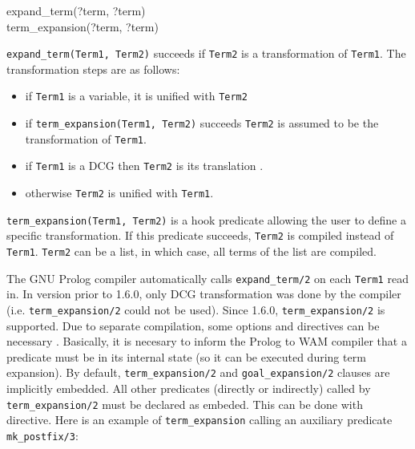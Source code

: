 \begin{TemplatesOneCol}
expand\_term(?term, ?term)\\
term\_expansion(?term, ?term)

\end{TemplatesOneCol}

\Description

\texttt{expand\_term(Term1, Term2)} succeeds if
\texttt{Term2} is a transformation of \texttt{Term1}. The transformation
steps are as follows:

\begin{itemize}

\item if \texttt{Term1} is a variable, it is unified with \texttt{Term2}

\item if \texttt{term\_expansion(Term1, Term2)} succeeds \texttt{Term2} is
  assumed to be the transformation of \texttt{Term1}.

\item if \texttt{Term1} is a DCG then \texttt{Term2} is its translation
  .

\item otherwise \texttt{Term2} is unified with \texttt{Term1}.

\end{itemize}

\texttt{term\_expansion(Term1, Term2)} is a hook predicate allowing the user to
define a specific transformation. If this predicate succeeds, \texttt{Term2} is
compiled instead of \texttt{Term1}. \texttt{Term2} can be a list, in which case,
all terms of the list are compiled.

The GNU Prolog compiler  automatically calls
\texttt{expand\_term/2} on each \texttt{Term1} read in. In version prior to
1.6.0, only DCG transformation was done by the compiler
(i.e. \texttt{term\_expansion/2} could not be used). Since 1.6.0,
\texttt{term\_expansion/2} is supported. Due to separate compilation, some
 options and directives can be necessary
. Basically, it is necesary to inform the Prolog to
WAM compiler that a predicate must be  in its internal state (so it
can be executed during term expansion). By default,
\texttt{term\_expansion/2} and \texttt{goal\_expansion/2} clauses are implicitly
embedded. All other predicates
(directly or indirectly) called by \texttt{term\_expansion/2} must be declared
as embeded. This can be done with  directive. Here is
an example of \texttt{term\_expansion} calling an auxiliary predicate
\texttt{mk\_postfix/3}:

